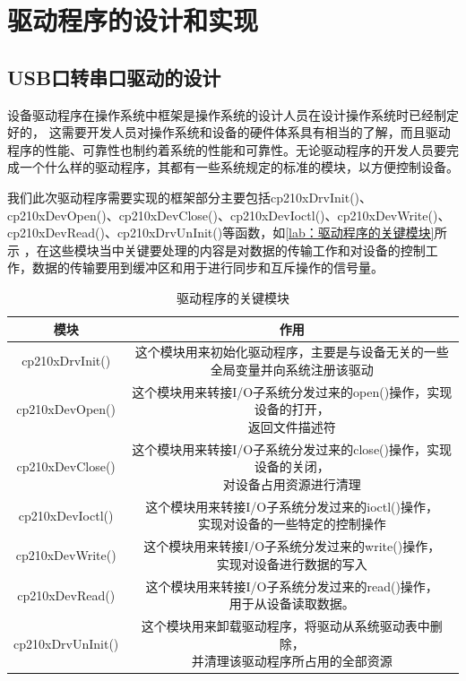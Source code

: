 \chapter{驱动程序的设计和实现}
	
\section{USB口转串口驱动的设计}
	设备驱动程序在操作系统中框架是操作系统的设计人员在设计操作系统时已经制定好的，	这需要开发人员对操作系统和设备的硬件体系具有相当的了解，而且驱动程序的性能、可靠性也制约着系统的性能和可靠性。无论驱动程序的开发人员要完成一个什么样的驱动程序，其都有一些系统规定的标准的模块，以方便控制设备。
	
	
	
	
	我们此次驱动程序需要实现的框架部分主要包括cp210xDrvInit()、cp210xDevOpen()、cp210xDevClose()、cp210xDevIoctl()、cp210xDevWrite()、cp210xDevRead()、cp210xDrvUnInit()等函数，如\autoref{lab：驱动程序的关键模块}所示 ，在这些模块当中关键要处理的内容是对数据的传输工作和对设备的控制工作，数据的传输要用到缓冲区和用于进行同步和互斥操作的信号量。
\begin{table}[!h]
\centering
\begin{tabular}{|c|c|}
\hline
{模块} & {作用} \\
\hline
{cp210xDrvInit()} & \tabincell{c}{这个模块用来初始化驱动程序，主要是与设备无关的一些\\全局变量并向系统注册该驱动} \\
\hline
{cp210xDevOpen()} & \tabincell{c}{这个模块用来转接I/O子系统分发过来的open()操作，实现设备的打开，\\返回文件描述符} \\
\hline
{cp210xDevClose()} & \tabincell{c}{这个模块用来转接I/O子系统分发过来的close()操作，实现设备的关闭，\\对设备占用资源进行清理} \\
\hline
{cp210xDevIoctl()} & \tabincell{c}{这个模块用来转接I/O子系统分发过来的ioctl()操作，\\实现对设备的一些特定的控制操作} \\
\hline
{cp210xDevWrite()} & \tabincell{c}{这个模块用来转接I/O子系统分发过来的write()操作，\\实现对设备进行数据的写入} \\
\hline
{cp210xDevRead()} & \tabincell{c}{这个模块用来转接I/O子系统分发过来的read()操作，\\用于从设备读取数据。} \\
\hline
{cp210xDrvUnInit()} & \tabincell{c}{这个模块用来卸载驱动程序，将驱动从系统驱动表中删除，\\并清理该驱动程序所占用的全部资源} \\
\hline
\end{tabular} 
\caption{驱动程序的关键模块}\label{lab：驱动程序的关键模块}
\end{table}

